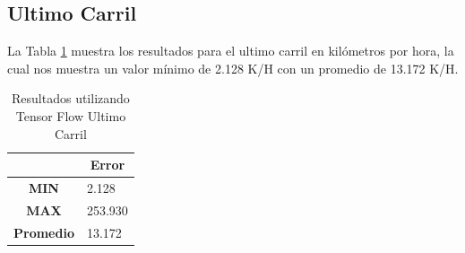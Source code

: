 \subsection{Ultimo Carril}

La Tabla \ref{tab:resultadosTFCUltimo} muestra los resultados para el ultimo carril en kilómetros por hora, la cual nos muestra un valor mínimo de 2.128 K/H con un promedio de 13.172 K/H.


\begin{table}[H]
    \centering
    \caption{Resultados utilizando Tensor Flow Ultimo Carril}
    \label{tab:resultadosTFCUltimo}
    \begin{tabular}{|c|l|}\hline

    & \multicolumn{1}{c|}{\textbf{Error}} \\ \hline
    \textbf{MIN} & 2.128 \\ \hline
    \textbf{MAX} & 253.930 \\ \hline
    \textbf{Promedio} & 13.172 \\ \hline
    \end{tabular}
\end{table}
